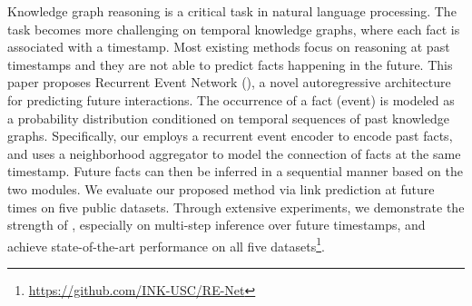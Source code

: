


Knowledge graph reasoning is a critical task in natural language processing.
The task becomes more challenging on temporal knowledge graphs, where each fact is associated with a timestamp.
Most existing methods focus on reasoning at past timestamps and they are not able to predict facts happening in the future.
This paper proposes Recurrent Event Network (\method), a novel autoregressive architecture for predicting future interactions.
The occurrence of a fact (event) is modeled as a probability distribution conditioned on temporal sequences of past knowledge graphs. 
Specifically, our \method employs a recurrent event encoder to encode past facts, and uses a neighborhood aggregator to model the connection of facts at the same timestamp.
Future facts can then be inferred in a sequential manner based on the two modules.
We evaluate our proposed method via link prediction at future times on five public datasets. Through extensive experiments, we demonstrate the strength of \method, especially on multi-step inference over future timestamps, and achieve state-of-the-art performance on all five datasets\footnote{\small \url{https://github.com/INK-USC/RE-Net}}.




%

